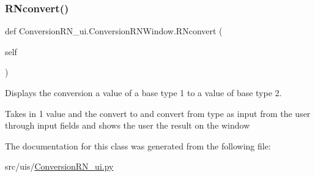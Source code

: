 \subsubsection{\texorpdfstring{R\+Nconvert()}{RNconvert()}}
{\footnotesize\ttfamily def Conversion\+R\+N\+\_\+ui.\+Conversion\+R\+N\+Window.\+R\+Nconvert (\begin{DoxyParamCaption}\item[{}]{self }\end{DoxyParamCaption})}



Displays the conversion a value of a base type 1 to a value of base type 2. 

Takes in 1 value and the convert to and convert from type as input from the user through input fields and shows the user the result on the window 

The documentation for this class was generated from the following file\+:\begin{DoxyCompactItemize}
\item 
src/uis/\hyperlink{_conversion_r_n__ui_8py}{Conversion\+R\+N\+\_\+ui.\+py}\end{DoxyCompactItemize}
